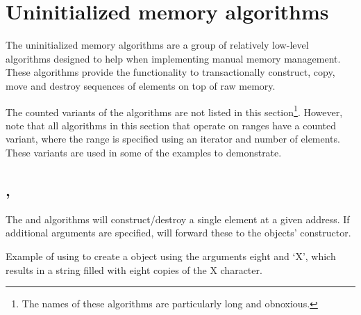 \section{Uninitialized memory algorithms}

The uninitialized memory algorithms are a group of relatively low-level algorithms designed to help when implementing manual memory management. These algorithms provide the functionality to transactionally construct, copy, move and destroy sequences of elements on top of raw memory.


The counted variants of the algorithms are not listed in this section\footnote{The names of these algorithms are particularly long and obnoxious.}. However, note that all algorithms in this section that operate on ranges have a counted variant, where the range is specified using an iterator and number of elements. These variants are used in some of the examples to demonstrate.

\subsection{\texorpdfstring{, }{\texttt{std::construct\_at}, \texttt{std::destroy\_at}}}

The  and  algorithms will construct/destroy a single element at a given address. If additional arguments are specified, \newline{} will forward these to the objects’ constructor.


\begin{codebox}[]{\href{https://compiler-explorer.com/z/fKMdoYd5r}{\ExternalLink}}
\footnotesize Example of using  to create a  object using the arguments eight and ‘X’, which results in a string filled with eight copies of the X character.
\tcblower
{}
\end{codebox}

